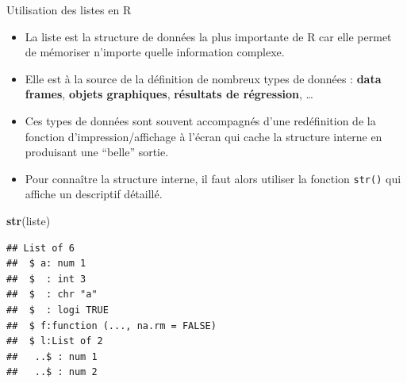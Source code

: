 \documentclass[
  ignorenonframetext,
]{beamer}
\newenvironment{Shaded}{\begin{snugshade}}{\end{snugshade}}
\newcommand{\FunctionTok}[1]{\textcolor[rgb]{0.13,0.29,0.53}{\textbf{#1}}}
\newcommand{\NormalTok}[1]{#1}
\providecommand{\tightlist}{%
  \setlength{\itemsep}{0pt}\setlength{\parskip}{0pt}}
\begin{document}
\begin{frame}[fragile]{Utilisation des listes en R}
\protect\hypertarget{utilisation-des-listes-en-r}{}
\begin{itemize}
\tightlist
\item
  La liste est la structure de données la plus importante de R car elle
  permet de mémoriser n'importe quelle information complexe.
\item
  Elle est à la source de la définition de nombreux types de données :
  \textbf{data frames}, \textbf{objets graphiques}, \textbf{résultats de
  régression}, \ldots{}
\item
  Ces types de données sont souvent accompagnés d'une redéfinition de la
  fonction d'impression/affichage à l'écran qui cache la structure
  interne en produisant une ``belle'' sortie.
\item
  Pour connaître la structure interne, il faut alors utiliser la
  fonction \texttt{str()} qui affiche un descriptif détaillé.
\end{itemize}

\tiny

\begin{Shaded}
\begin{Highlighting}[]
\FunctionTok{str}\NormalTok{(liste)}
\end{Highlighting}
\end{Shaded}

\begin{verbatim}
## List of 6
##  $ a: num 1
##  $  : int 3
##  $  : chr "a"
##  $  : logi TRUE
##  $ f:function (..., na.rm = FALSE)  
##  $ l:List of 2
##   ..$ : num 1
##   ..$ : num 2
\end{verbatim}

\normalsize
\end{frame}
\end{document}
